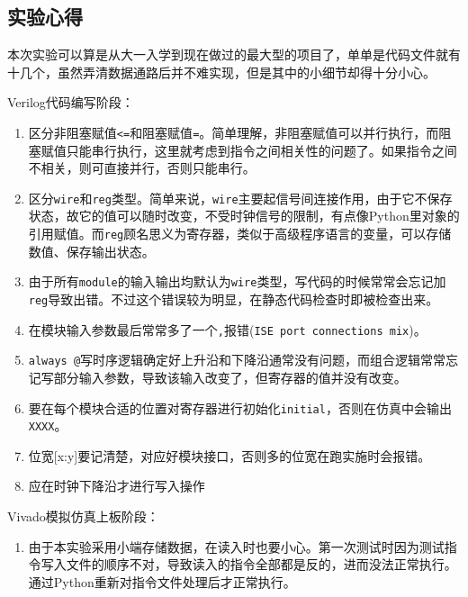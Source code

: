 \documentclass[12pt,UTF8]{ctexart}
\begin{document}
\begin{spacing}{1.1}
\section{实验心得}
\qquad 本次实验可以算是从大一入学到现在做过的最大型的项目了，单单是代码文件就有十几个，虽然弄清数据通路后并不难实现，但是其中的小细节却得十分小心。
\par Verilog代码编写阶段：
\begin{enumerate}
	\item 区分非阻塞赋值\verb'<='和阻塞赋值\verb'='。简单理解，非阻塞赋值可以并行执行，而阻塞赋值只能串行执行，这里就考虑到指令之间相关性的问题了。如果指令之间不相关，则可直接并行，否则只能串行。
    \item 区分\verb'wire'和\verb'reg'类型。简单来说，\verb'wire'主要起信号间连接作用，由于它不保存状态，故它的值可以随时改变，不受时钟信号的限制，有点像Python里对象的引用赋值。而\verb'reg'顾名思义为寄存器，类似于高级程序语言的变量，可以存储数值、保存输出状态。
    \item 由于所有\verb'module'的输入输出均默认为\verb'wire'类型，写代码的时候常常会忘记加\verb'reg'导致出错。不过这个错误较为明显，在静态代码检查时即被检查出来。
    \item 在模块输入参数最后常常多了一个\verb','报错(\verb'ISE port connections mix')。
    \item \verb'always @'写时序逻辑确定好上升沿和下降沿通常没有问题，而组合逻辑常常忘记写部分输入参数，导致该输入改变了，但寄存器的值并没有改变。
    \item 要在每个模块合适的位置对寄存器进行初始化\verb'initial'，否则在仿真中会输出\verb'XXXX'。
    \item 位宽[x:y]要记清楚，对应好模块接口，否则多的位宽在跑实施时会报错。
    \item 应在时钟下降沿才进行写入操作
\end{enumerate}
\par Vivado模拟仿真上板阶段：
\begin{enumerate}
    \item 由于本实验采用小端存储数据，在读入时也要小心。第一次测试时因为测试指令写入文件的顺序不对，导致读入的指令全部都是反的，进而没法正常执行。通过Python重新对指令文件处理后才正常执行。

\end{enumerate}
\end{spacing}
\end{document}
